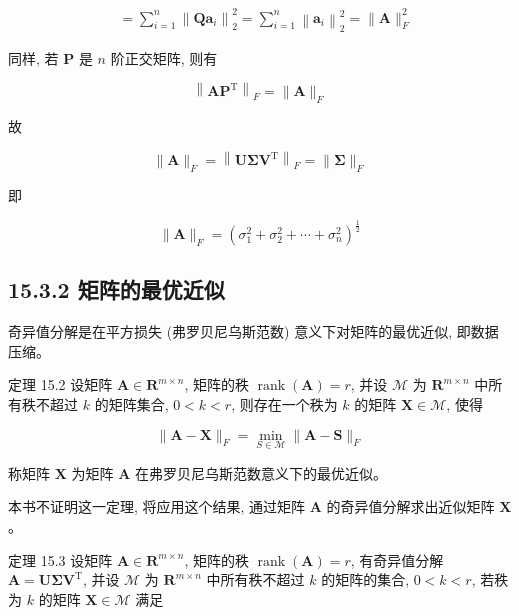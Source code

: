 \documentclass[10pt]{article}
\begin{document}
$$
\begin{aligned}
& =\sum_{i=1}^{n}\left\|\boldsymbol{Q} \boldsymbol{a}_{i}\right\|_{2}^{2}=\sum_{i=1}^{n}\left\|\boldsymbol{a}_{i}\right\|_{2}^{2}=\|\boldsymbol{A}\|_{F}^{2}
\end{aligned}
$$

同样, 若 $\boldsymbol{P}$ 是 $n$ 阶正交矩阵, 则有


\begin{equation*}
\left\|\boldsymbol{A} \boldsymbol{P}^{\mathrm{T}}\right\|_{F}=\|\boldsymbol{A}\|_{F} \tag{15.28}
\end{equation*}


故


\begin{equation*}
\|\boldsymbol{A}\|_{F}=\left\|\boldsymbol{U} \boldsymbol{\Sigma} \boldsymbol{V}^{\mathrm{T}}\right\|_{F}=\|\boldsymbol{\Sigma}\|_{F} \tag{15.29}
\end{equation*}


即


\begin{equation*}
\|\boldsymbol{A}\|_{F}=\left(\sigma_{1}^{2}+\sigma_{2}^{2}+\cdots+\sigma_{n}^{2}\right)^{\frac{1}{2}} \tag{15.30}
\end{equation*}


\subsection*{15.3.2 矩阵的最优近似}
奇异值分解是在平方损失 (弗罗贝尼乌斯范数) 意义下对矩阵的最优近似, 即数据压缩。

定理 15.2 设矩阵 $\boldsymbol{A} \in \boldsymbol{R}^{m \times n}$, 矩阵的秩 $\operatorname{rank}(\boldsymbol{A})=r$, 并设 $\mathcal{M}$ 为 $\boldsymbol{R}^{m \times n}$ 中所有秩不超过 $k$ 的矩阵集合, $0<k<r$, 则存在一个秩为 $k$ 的矩阵 $\boldsymbol{X} \in \mathcal{M}$, 使得


\begin{equation*}
\|\boldsymbol{A}-\boldsymbol{X}\|_{F}=\min _{S \in \mathcal{M}}\|\boldsymbol{A}-\boldsymbol{S}\|_{F} \tag{15.31}
\end{equation*}


称矩阵 $\boldsymbol{X}$ 为矩阵 $\boldsymbol{A}$ 在弗罗贝尼乌斯范数意义下的最优近似。

本书不证明这一定理, 将应用这个结果, 通过矩阵 $\boldsymbol{A}$ 的奇异值分解求出近似矩阵 $\boldsymbol{X}$ 。

定理 15.3 设矩阵 $\boldsymbol{A} \in \boldsymbol{R}^{m \times n}$, 矩阵的秩 $\operatorname{rank}(\boldsymbol{A})=r$, 有奇异值分解 $\boldsymbol{A}=\boldsymbol{U} \boldsymbol{\Sigma} \boldsymbol{V}^{\mathrm{T}}$, 并设 $\mathcal{M}$ 为 $\boldsymbol{R}^{m \times n}$ 中所有秩不超过 $k$ 的矩阵的集合, $0<k<r$, 若秩为 $k$ 的矩阵 $\boldsymbol{X} \in \mathcal{M}$ 满足
\end{document}
